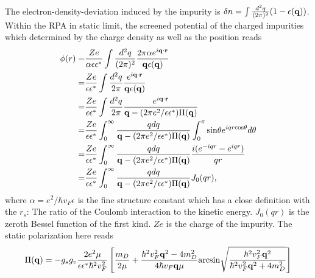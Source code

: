 \documentclass[UTF8,a4paper]{article}
\begin{document}
\begin{large}
The electron-density-deviation induced by the impurity is $\delta n=\int\frac{d^{2}q}{(2\pi)^{2}}(1-\epsilon({\bf q}))$.
Within the RPA in static limit, the screened potential of the charged impurities which determined by the charge density as well as the position reads
\begin{equation} 
\begin{aligned}
\phi(r)=&\frac{Ze}{\alpha\epsilon\epsilon^{*}}\int\frac{d^{2}q}{(2\pi)^{2}}\frac{2\pi\alpha e^{i{\bf q}\cdot{\bf r}}}{{\bf q}\epsilon({\bf q})}\\
=&\frac{Ze}{\epsilon\epsilon^{*}}\int\frac{d^{2}q}{2\pi}\frac{e^{i{\bf q}\cdot{\bf r}}}{{\bf q}\epsilon({\bf q})}\\
=&\frac{Ze}{\epsilon\epsilon^{*}}\int\frac{d^{2}q}{2\pi}\frac{e^{i{\bf q}\cdot{\bf r}}}{{\bf q}-(2\pi e^{2}/\epsilon\epsilon^{*})\Pi({\bf q})}\\
=&\frac{Ze}{\epsilon\epsilon^{*}}\int^{\infty}_{0}\frac{qdq}{{\bf q}-(2\pi e^{2}/\epsilon\epsilon^{*})\Pi({\bf q})}\int^{\pi}_{0}{\rm sin}\theta 
e^{iqr{\rm cos}\theta}d\theta\\
=&\frac{Ze}{\epsilon\epsilon^{*}}\int^{\infty}_{0}\frac{qdq}{{\bf q}-(2\pi e^{2}/\epsilon\epsilon^{*})\Pi({\bf q})}\frac{i(e^{-iqr}-e^{iqr})}{qr}\\
=&\frac{Ze}{\epsilon\epsilon^{*}}\int^{\infty}_{0}\frac{qdq}{{\bf q}-(2\pi e^{2}/\epsilon\epsilon^{*})\Pi({\bf q})}J_{0}(qr),\\
\end{aligned}
\end{equation}
where $\alpha=e^{2}/\hbar v_{F}\epsilon$ is the fine structure constant
which has a close definition with the $r_{s}$:
The ratio of the Coulomb interaction to the kinetic energy.
$J_{0}(qr)$ is the zeroth Bessel function of the first kind.
$Ze$ is the charge of the impurity.
The static polarization here reads\cite{Wu C H3,XX,Wu C H_3,Tabert C J}
\begin{equation} 
\begin{aligned}
\Pi({\bf q})=-g_{s}g_{v}\frac{2e^{2}\mu}{\epsilon\epsilon^{*}\hbar^{2}v_{F}^{2}}
\left[\frac{ m_{D}}{2\mu}+\frac{\hbar^{2} v_{F}^{2}{\bf q}^{2}-4 m_{D}^{2}}{4\hbar v_{F}{\bf q}\mu}{\rm arcsin}\sqrt{\frac{\hbar^{2}v_{F}^{2}{\bf q}^{2}}{\hbar^{2}v_{F}^{2}{\bf q}^{2}+4 m_{D}^{2}}}\right]
\end{aligned}

\end{equation}
\end{large}
\end{document}

